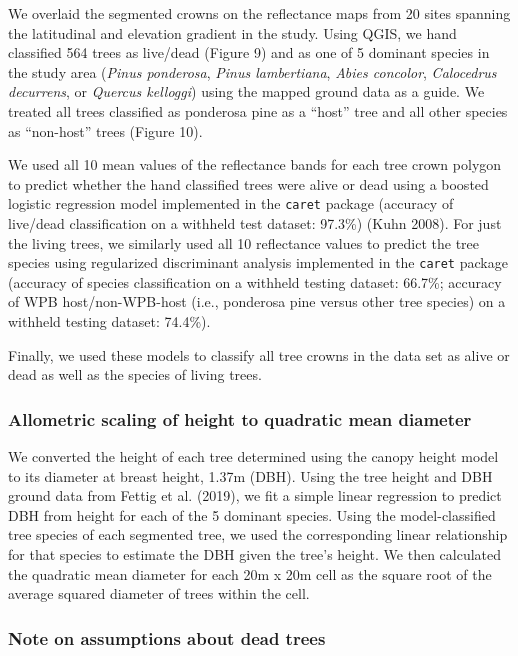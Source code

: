 \documentclass[]{article}
\begin{document}
We overlaid the segmented crowns on the reflectance maps from 20 sites
spanning the latitudinal and elevation gradient in the study. Using
QGIS, we hand classified 564 trees as live/dead (Figure 9) and as one of
5 dominant species in the study area (\emph{Pinus ponderosa},
\emph{Pinus lambertiana}, \emph{Abies concolor}, \emph{Calocedrus
decurrens}, or \emph{Quercus kelloggi}) using the mapped ground data as
a guide. We treated all trees classified as ponderosa pine as a ``host''
tree and all other species as ``non-host'' trees (Figure 10).

We used all 10 mean values of the reflectance bands for each tree crown
polygon to predict whether the hand classified trees were alive or dead
using a boosted logistic regression model implemented in the
\texttt{caret} package (accuracy of live/dead classification on a
withheld test dataset: 97.3\%) (Kuhn 2008). For just the living trees,
we similarly used all 10 reflectance values to predict the tree species
using regularized discriminant analysis implemented in the
\texttt{caret} package (accuracy of species classification on a withheld
testing dataset: 66.7\%; accuracy of WPB host/non-WPB-host (i.e.,
ponderosa pine versus other tree species) on a withheld testing dataset:
74.4\%).

Finally, we used these models to classify all tree crowns in the data
set as alive or dead as well as the species of living trees.

\subsubsection{Allometric scaling of height to quadratic mean
diameter}\label{allometric-scaling-of-height-to-quadratic-mean-diameter}

We converted the height of each tree determined using the canopy height
model to its diameter at breast height, 1.37m (DBH). Using the tree
height and DBH ground data from Fettig et al. (2019), we fit a simple
linear regression to predict DBH from height for each of the 5 dominant
species. Using the model-classified tree species of each segmented tree,
we used the corresponding linear relationship for that species to
estimate the DBH given the tree's height. We then calculated the
quadratic mean diameter for each 20m x 20m cell as the square root of
the average squared diameter of trees within the cell.

\subsubsection{Note on assumptions about dead
trees}\label{note-on-assumptions-about-dead-trees}
\end{document}
